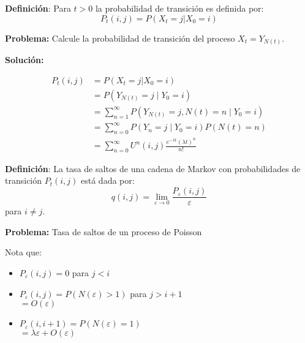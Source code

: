 \documentclass[12pt,a4paper]{article}
\newcommand{\definicion}[1]{%
\begin{definicionbox}
\textbf{Definición}: #1
\end{definicionbox}
}
\begin{document}
\begin{center}
\end{center}

\definicion{Para $t > 0$ la probabilidad de transición es definida por:
\begin{equation*}
P_t(i,j) = P(X_t = j | X_0 = i)
\end{equation*}}

\textbf{Problema:} Calcule la probabilidad de transición del proceso $X_t = Y_{N(t)}$.

\textbf{Solución:}

\begin{align*}
P_t(i,j) &= P(X_t = j | X_0 = i) \\
&= P\left(Y_{N(t)} = j \mid Y_0 = i\right) \\
&= \sum_{n=1}^{\infty} P\left(Y_{N(t)} = j, N(t) = n \mid Y_0 = i\right) \\
&= \sum_{n=0}^{\infty} P\left(Y_n = j \mid Y_0 = i\right) P(N(t) = n) \\
&= \sum_{n=0}^{\infty} U^n(i,j) \frac{e^{-\lambda t}(\lambda t)^n}{n!}
\end{align*}

\definicion{La tasa de saltos de una cadena de Markov con probabilidades de transición $P_t(i,j)$ está dada por:
\begin{equation*}
q(i,j) = \lim_{\varepsilon \to 0} \frac{P_\varepsilon(i,j)}{\varepsilon}
\end{equation*}
para $i \neq j$.}

\textbf{Problema:} Tasa de saltos de un proceso de Poisson

Nota que:

\begin{itemize}
    \item $P_\varepsilon(i,j) = 0$ para $j < i$
    \item $P_\varepsilon(i,j) = P(N(\varepsilon) > 1)$ para $j > i+1$\\
    \hspace{1.5em} $= O(\varepsilon)$
    \item $P_\varepsilon(i, i+1) = P(N(\varepsilon) = 1)$\\
    \hspace{1.5em} $= \lambda\varepsilon + O(\varepsilon)$
\end{itemize}
\end{document}

